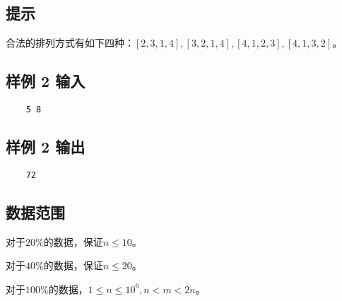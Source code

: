 \documentclass[12pt]{article}
\begin{document}
\subsection{提示}

合法的排列方式有如下四种：$[2, 3, 1, 4], [3, 2, 1, 4], [4, 1, 2, 3], [4, 1, 3, 2]$。

\subsection{样例 2 输入}

\begin{lstlisting}
    5 8
\end{lstlisting}

\subsection{样例 2 输出}

\begin{lstlisting}
    72
\end{lstlisting}

\subsection{数据范围}

对于$20\%$的数据，保证$n\leq 10$。\par
对于$40\%$的数据，保证$n\leq 20$。\par
对于$100\%$的数据，$1\leq n\leq 10^6, n < m < 2n$。
\end{document}
